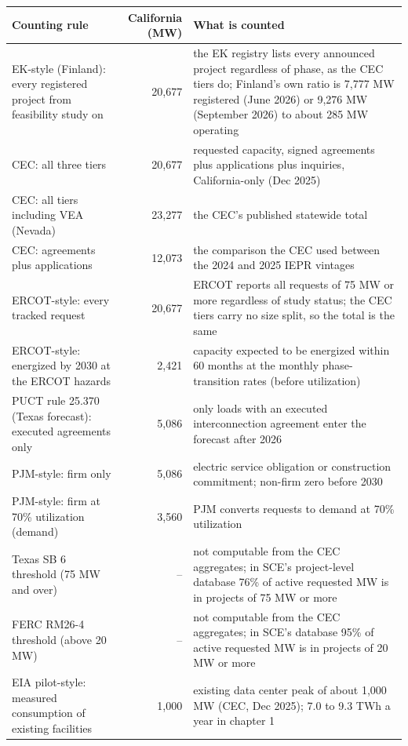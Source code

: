 \begin{tabular}{p{5.2cm}rp{8.6cm}}
\toprule
Counting rule & California (MW) & What is counted \\
\midrule
EK-style (Finland): every registered project from feasibility study on & 20,677 & the EK registry lists every announced project regardless of phase, as the CEC tiers do; Finland's own ratio is 7,777 MW registered (June 2026) or 9,276 MW (September 2026) to about 285 MW operating \\
CEC: all three tiers & 20,677 & requested capacity, signed agreements plus applications plus inquiries, California-only (Dec 2025) \\
CEC: all tiers including VEA (Nevada) & 23,277 & the CEC's published statewide total \\
CEC: agreements plus applications & 12,073 & the comparison the CEC used between the 2024 and 2025 IEPR vintages \\
ERCOT-style: every tracked request & 20,677 & ERCOT reports all requests of 75 MW or more regardless of study status; the CEC tiers carry no size split, so the total is the same \\
ERCOT-style: energized by 2030 at the ERCOT hazards & 2,421 & capacity expected to be energized within 60 months at the monthly phase-transition rates (before utilization) \\
PUCT rule 25.370 (Texas forecast): executed agreements only & 5,086 & only loads with an executed interconnection agreement enter the forecast after 2026 \\
PJM-style: firm only & 5,086 & electric service obligation or construction commitment; non-firm zero before 2030 \\
PJM-style: firm at 70\% utilization (demand) & 3,560 & PJM converts requests to demand at 70\% utilization \\
Texas SB 6 threshold (75 MW and over) & -- & not computable from the CEC aggregates; in SCE's project-level database 76\% of active requested MW is in projects of 75 MW or more \\
FERC RM26-4 threshold (above 20 MW) & -- & not computable from the CEC aggregates; in SCE's database 95\% of active requested MW is in projects of 20 MW or more \\
EIA pilot-style: measured consumption of existing facilities & 1,000 & existing data center peak of about 1,000 MW (CEC, Dec 2025); 7.0 to 9.3 TWh a year in chapter 1 \\
\bottomrule
\end{tabular}
